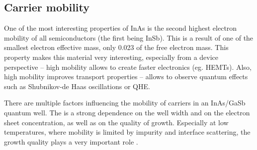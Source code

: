 \documentclass[titlepage,a4paper]{book}
\newcommand{\wciecie}{\quad\phantom{v}}
\begin{document}
\subsection{Carrier mobility}
\wciecie
One of the most interesting properties of InAs is the second highest electron mobility of all semiconductors (the first being InSb). This is a result of one of the smallest electron effective mass, only 0.023 of the free electron mass. This property makes this material very interesting, especially from a device perspective -- high mobility allows to create faster electronics (eg. HEMTs). Also, high mobility improves transport properties -- allows to observe quantum effects such as Shubnikov-de Haas oscillations or QHE.

There are multiple factors influencing the mobility of carriers in an InAs/GaSb quantum well. The is a strong dependence on the well width and on the electron sheet concentration, as well as on the quality of growth. Especially at low temperatures, where mobility is limited by impurity and interface scattering, the growth quality plays a very important role \cite{Nguyen_Mobility}.
\end{document}
